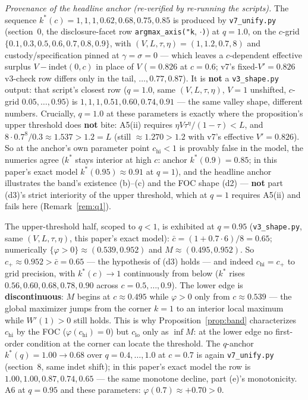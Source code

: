 \begin{remark}\label{rem:anchors}
\emph{Provenance of the headline anchor (re-verified by re-running the scripts).} The
sequence $k^*(c) = 1, 1, 1, 0.62, 0.68, 0.75, 0.85$ is produced by
\texttt{v7\_unify.py} (section~0, the disclosure-facet row
\texttt{argmax\_axis("k}, $\cdot$\texttt{)}) at $q = 1.0$, on the $c$-grid
$\{0.1, 0.3, 0.5, 0.6, 0.7, 0.8, 0.9\}$, with
$(V, L, \tau, \eta) = (1, 1.2, 0.7, 8)$ and custody/specification pinned at
$\gamma = \sigma = 0$ --- which leaves a $c$-dependent effective surplus
$V - \mathrm{indet}(0, c)$ in place of $V$ ($= 0.826$ at $c = 0.6$; v7's
fixed-$V' = 0.826$ v3-check row differs only in the tail, $\ldots, 0.77, 0.87$). It is
\textbf{not} a \texttt{v3\_shape.py} output: that script's closest row ($q = 1.0$, same
$(V, L, \tau, \eta)$, $V = 1$ unshifted, $c$-grid $0.05, \ldots, 0.95$) is
$1, 1, 1, 0.51, 0.60, 0.74, 0.91$ --- the same valley shape, different numbers.
Crucially, $q = 1.0$ at these parameters is exactly where the proposition's upper
threshold does \textbf{not} bite: A5(ii) requires $\eta V \tau^{\eta}/(1 - \tau) < L$,
and $8 \cdot 0.7^{8}/0.3 \approx 1.537 > 1.2 = L$ (still $\approx 1.270 > 1.2$ with
v7's effective $V' = 0.826$). So at the anchor's own parameter point
$c_{\mathrm{hi}} < 1$ is provably false in the model, the numerics agree ($k^*$ stays
interior at high $c$: anchor $k^*(0.9) = 0.85$; in this paper's exact model
$k^*(0.95) \approx 0.91$ at $q = 1$), and the headline anchor illustrates the band's
existence (b)--(c) and the FOC shape (d2) --- \textbf{not} part (d3)'s strict
interiority of the upper threshold, which at $q = 1$ requires A5(ii) and fails here
(Remark~\ref{rem:q1}).

The upper-threshold half, scoped to $q < 1$, is exhibited at $q = 0.95$
(\texttt{v3\_shape.py}, same $(V, L, \tau, \eta)$, this paper's exact model):
$\bar c = (1 + 0.7 \cdot 6)/8 = 0.65$; numerically
$\{\varphi > 0\} \approx (0.539, 0.952)$ and $M \approx (0.495, 0.952)$. So
$c_+ \approx 0.952 > \bar c = 0.65$ --- the hypothesis of (d3) holds --- and indeed
$c_{\mathrm{hi}} = c_+$ to grid precision, with $k^*(c) \to 1$ continuously from below
($k^*$ rises $0.56, 0.60, 0.68, 0.78, 0.90$ across $c = 0.5, \ldots, 0.9$). The lower
edge is \textbf{discontinuous}: $M$ begins at $c \approx 0.495$ while $\varphi > 0$
only from $c \approx 0.539$ --- the global maximizer jumps from the corner $k = 1$ to
an interior local maximum while $W'(1) > 0$ still holds. This is why
Proposition~\ref{prop:band} characterizes $c_{\mathrm{hi}}$ by the FOC
($\varphi(c_{\mathrm{hi}}) = 0$) but $c_{\mathrm{lo}}$ only as $\inf M$: at the lower
edge no first-order condition at the corner can locate the threshold. The $q$-anchor
$k^*(q) = 1.00 \to 0.68$ over $q = 0.4, \ldots, 1.0$ at $c = 0.7$ is again
\texttt{v7\_unify.py} (section~8, same $\mathrm{indet}$ shift); in this paper's exact
model the row is $1.00, 1.00, 0.87, 0.74, 0.65$ --- the same monotone decline, part
(e)'s monotonicity. A6 at $q = 0.95$ and these parameters:
$\varphi(0.7) \approx +0.70 > 0$.~\checkmark
\end{remark}

